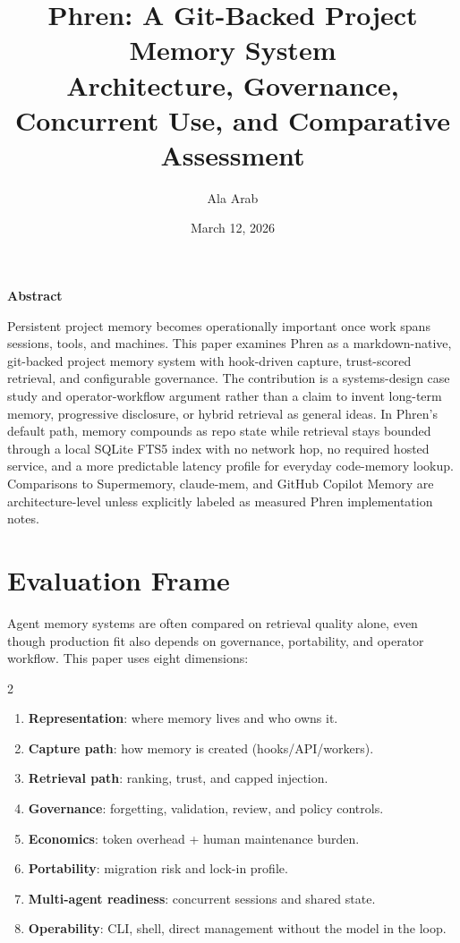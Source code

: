 \documentclass[10pt]{article}
\title{\vspace{-0.8em}Phren: A Git-Backed Project Memory System\\[2pt]
\large Architecture, Governance, Concurrent Use, and Comparative Assessment}
\author{Ala Arab}
\date{March 12, 2026}
\renewenvironment{abstract}{%
  \begin{center}\textbf{Abstract}\end{center}\small\noindent%
}{\par\medskip}
\begin{document}
\maketitle\vspace{-1em}

\begin{abstract}
\noindent Persistent project memory becomes operationally important once work spans sessions, tools, and machines. This paper examines Phren as a markdown-native, git-backed project memory system with hook-driven capture, trust-scored retrieval, and configurable governance. The contribution is a systems-design case study and operator-workflow argument rather than a claim to invent long-term memory, progressive disclosure, or hybrid retrieval as general ideas. In Phren's default path, memory compounds as repo state while retrieval stays bounded through a local SQLite FTS5 index with no network hop, no required hosted service, and a more predictable latency profile for everyday code-memory lookup. Comparisons to Supermemory, claude-mem, and GitHub Copilot Memory are architecture-level unless explicitly labeled as measured Phren implementation notes.
\end{abstract}

\vspace{0.1em}
\section{Evaluation Frame}
\label{sec:criteria}
Agent memory systems are often compared on retrieval quality alone, even though production fit also depends on governance, portability, and operator workflow. This paper uses eight dimensions:
\begin{multicols}{2}
\raggedright
\begin{enumerate}
  \item \textbf{Representation}: where memory lives and who owns it.
  \item \textbf{Capture path}: how memory is created (hooks/API/workers).
  \item \textbf{Retrieval path}: ranking, trust, and capped injection.
  \item \textbf{Governance}: forgetting, validation, review, and policy controls.
  \item \textbf{Economics}: token overhead + human maintenance burden.
  \item \textbf{Portability}: migration risk and lock-in profile.
  \item \textbf{Multi-agent readiness}: concurrent sessions and shared state.
  \item \textbf{Operability}: CLI, shell, direct management without the model in the loop.
\end{enumerate}
\end{multicols}
\end{document}
